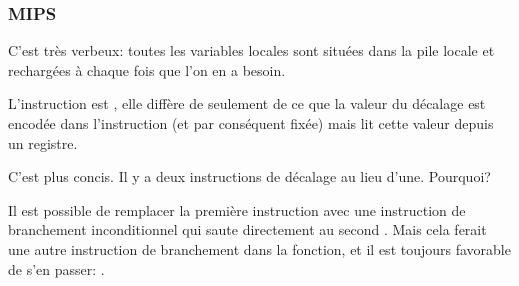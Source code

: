 \subsubsection{MIPS}





C'est très verbeux: toutes les variables locales sont situées dans la pile locale
et rechargées à chaque fois que l'on en a besoin.

L'instruction \SLLV est , elle diffère de \SLL
seulement de ce que la valeur du décalage est encodée dans l'instruction \SLL (et
par conséquent fixée) mais \SLLV lit cette valeur depuis un registre.


C'est plus concis.
Il y a deux instructions de décalage au lieu d'une.
Pourquoi?

Il est possible de remplacer la première instruction \SLLV avec une instruction de
branchement inconditionnel qui saute directement au second \SLLV.
Mais cela ferait une autre instruction de branchement dans la fonction, et il est
toujours favorable de s'en passer: .



